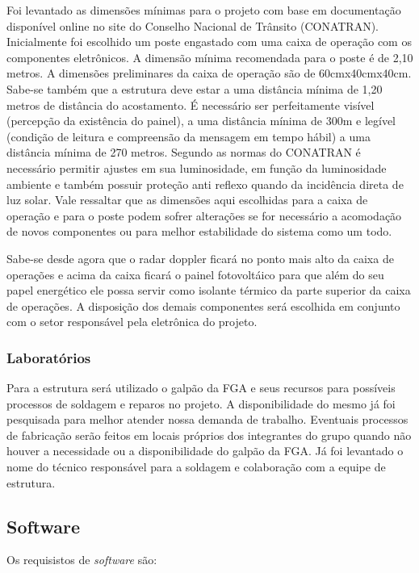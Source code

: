 Foi levantado as dimensões mínimas para o projeto com base em documentação
disponível online no site do Conselho Nacional de Trânsito (CONATRAN).
Inicialmente foi escolhido um poste engastado com uma caixa de operação com os
componentes eletrônicos. A dimensão mínima recomendada para o poste é de 2,10
metros. A dimensões preliminares da caixa de operação são de 60cmx40cmx40cm.
Sabe-se também que a estrutura deve estar a uma distância mínima de 1,20 metros
de distância do acostamento. É necessário ser perfeitamente visível (percepção da
existência do painel), a uma distância mínima de 300m e legível (condição de leitura
e compreensão da mensagem em tempo hábil) a uma distância mínima de 270
metros. Segundo as normas do CONATRAN é necessário permitir ajustes em sua
luminosidade, em função da luminosidade ambiente e também possuir proteção anti
reflexo quando da incidência direta de luz solar.
Vale ressaltar que as dimensões aqui escolhidas para a caixa de operação e para o
poste podem sofrer alterações se for necessário a acomodação de novos
componentes ou para melhor estabilidade do sistema como um todo.

Sabe-se desde agora que o radar doppler ficará no ponto mais alto da caixa de
operações e acima da caixa ficará o painel fotovoltáico para que além do seu papel
energético ele possa servir como isolante térmico da parte superior da caixa de
operações. A disposição dos demais componentes será escolhida em conjunto com
o setor responsável pela eletrônica do projeto.

\subsubsection{Laboratórios}
Para a estrutura será utilizado o galpão da FGA e seus recursos para possíveis
processos de soldagem e reparos no projeto. A disponibilidade do mesmo já foi
pesquisada para melhor atender nossa demanda de trabalho. Eventuais processos
de fabricação serão feitos em locais próprios dos integrantes do grupo quando não
houver a necessidade ou a disponibilidade do galpão da FGA. Já foi levantado o
nome do técnico responsável para a soldagem e colaboração com a equipe de
estrutura.

\subsection{Software}

Os requisistos de \emph{software} são:

